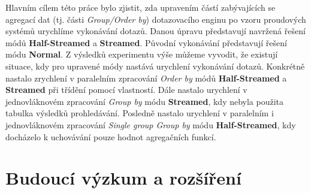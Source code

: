 Hlavním cílem této práce bylo zjistit, zda upravením částí zabývajících se agregací dat (tj. části  \textit{Group/Order by}) dotazovacího enginu po vzoru proudových systémů urychlíme vykonávání dotazů.
Danou úpravu představují navržená řešení módů \textbf{Half-Streamed} a \textbf{Streamed}.
Původní vykonávání představují řešení módu \textbf{Normal}.
Z výsledků experimentu výše můžeme vyvodit, že existují situace, kdy pro upravené módy nastává urychlení vykonávání dotazů.
Konkrétně nastalo zrychlení v paralelním zpracování \textit{Order by} módů \textbf{Half-Streamed} a \textbf{Streamed} při třídění pomocí vlastností.
Dále nastalo urychlení v jednovláknovém zpracování \textit{Group by} módu \textbf{Streamed}, kdy nebyla použita tabulka výsledků prohledávání.
Posledně nastalo urychlení v paralelním i jednovláknovém zpracování \textit{Single group Group by} módu \textbf{Half-Streamed}, kdy docházelo k uchovávání pouze hodnot agregačních funkcí.

\section*{Budoucí výzkum a rozšíření}

